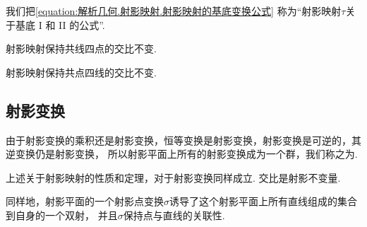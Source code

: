 我们把\cref{equation:解析几何.射影映射.射影映射的基底变换公式}
称为“射影映射\(\tau\)关于基底 I 和 II 的公式”.

\begin{property}
射影映射保持共线四点的交比不变.
\end{property}

\begin{property}
射影映射保持共点四线的交比不变.
\end{property}

\subsection{射影变换}
由于射影变换的乘积还是射影变换，恒等变换是射影变换，射影变换是可逆的，其逆变换仍是射影变换，
所以射影平面上所有的射影变换成为一个群，我们称之为.

上述关于射影映射的性质和定理，对于射影变换同样成立.
交比是射影不变量.

同样地，射影平面的一个射影点变换\(\sigma\)诱导了这个射影平面上所有直线组成的集合到自身的一个双射，
并且\(\sigma\)保持点与直线的关联性.

